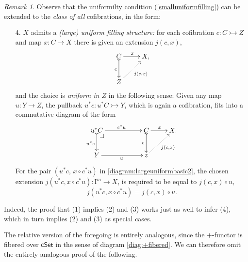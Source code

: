 \documentclass[12pt]{article}
\makeatletter
\newcommand{\cSet}{\ensuremath{\mathsf{cSet}}}
\newcommand{\mono}{\ensuremath{\rightarrowtail}}
\newcommand{\ra}{\ensuremath{\rightarrow}}
\newcommand{\I}{\ensuremath{\mathrm{I}}}
\theoremstyle{remark}
\newtheorem{remark}[theorem]{Remark}
\theoremstyle{definition}
\newcommand{\pbcorner}[1][dr]{\save*!/#1-1.2pc/#1:(-1,1)@^{|-}\restore}
\makeatother
\begin{document}
 \begin{remark}\label{remark:largeuniformfilling}
 Observe that the uniformilty condition (\ref{smalluniformfilling}) can be extended to the \emph{class of all} cofibrations, in the form:
 
 \begin{enumerate}
 \item[4.]\label{largeuniformfilling} $X$ admits a \emph{(large) uniform filling structure:} 
for each cofibration $c : C \mono Z$ and map $x : C\ra X$ there is given an extension $j(c,x)$,
\begin{equation}\label{diagram:largeuniformbasic}
\xymatrix{
C \ar@{>->}[d]_{c} \ar[r]^{x} & X, \\
Z\ar@{.>}[ru]_{j(c,x)} &
}
\end{equation}
and the choice is \emph{uniform in $Z$} in the following sense:
Given any map $u :Y \ra Z$, the pullback $u^*c : u^*C\mono Y$, which is again a cofibration, fits into a commutative diagram of the form
\begin{equation}\label{diagram:largeuniformbasic2}
\xymatrix{
u^*C \ar@{>->}[d]_{u^*c} \ar[rr]^{c^*u} \pbcorner &&  C \ar@{>->}[d]_{c} \ar[r]^{x} & X. \\
Y \ar[rr]_{u} && z \ar@{.>}[ru]_{j(c,x)} &
}
\end{equation}
For the pair $(u^*c,\, x\circ c^*u)$ in \eqref{diagram:largeuniformbasic2}, the chosen extension $j(u^*c,x\circ c^*u): \I^m \ra X$, is required to be equal to  $j(c,x)\circ u$,
\begin{equation}\label{eq:largeuniformfillers}
j(u^*c,x\circ c^*u) = j(c,x) \circ u.
\end{equation}
\end{enumerate}
Indeed, the proof that (1) implies (2) and (3) works just as well to infer (4), which in turn implies (2) and (3) as special cases.
\end{remark}

The relative version of the foregoing is entirely analogous, since the $+$-functor is fibered over $\cSet$ in the sense of diagram \eqref{diag:+fibered}.  We can therefore omit the entirely analogous proof of the following.
 
\end{document}
